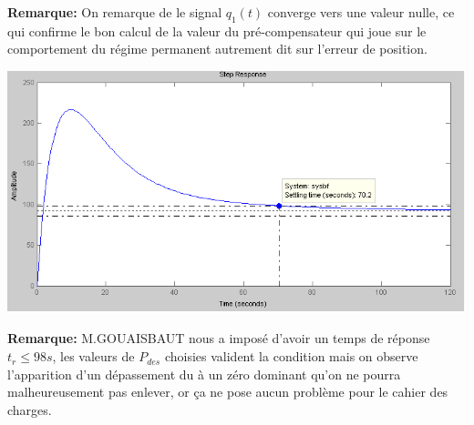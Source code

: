 			\textbf{Remarque:} On remarque de le signal $q_1(t)$ converge vers une valeur nulle, ce qui confirme le bon calcul de la valeur du pré-compensateur qui joue sur le comportement du régime permanent autrement dit sur l'erreur de position. 
		
		\begin{center}
		\includegraphics[scale=0.5]{h1(t).PNG} 
		\label{fig3}
		\end{center}
		
		\textbf{Remarque:} M.GOUAISBAUT nous a imposé d'avoir un temps de réponse $t_{r}  \leqslant 98s$, les valeurs de $P_{des}$ choisies valident la condition mais on observe l'apparition d'un dépassement du à un zéro dominant qu'on ne pourra malheureusement pas enlever, or ça ne pose aucun problème pour le cahier des charges. 
		
		